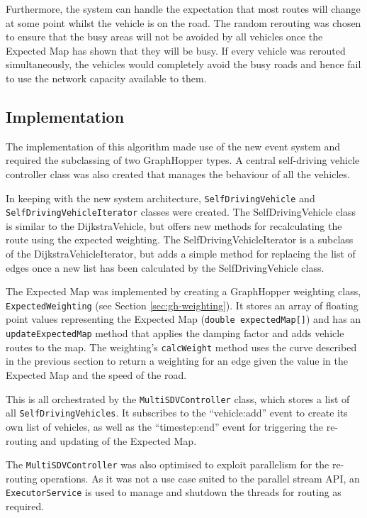 \documentclass[ %
                    author={Alexander Hill},
                supervisor={Dr. Benjamin Sach},
                    degree={MEng},
                     title={MARMOSET},
                  subtitle={Multi-Agent Route Management using Online Simulation for Efficient Transportation},
                      type={research},
                      year={2016} ]{dissertation}
\begin{document}
Furthermore, the system can handle the expectation that most routes will
change at some point whilst the vehicle is on the road. The random rerouting was
chosen to ensure that the busy areas will not be avoided by all vehicles once the
Expected Map has shown that they will be busy. If every vehicle was rerouted
simultaneously, the vehicles would completely avoid the busy roads and hence
fail to use the network capacity available to them.

\subsection{Implementation}

The implementation of this algorithm made use of the new event system and
required the subclassing of two GraphHopper types. A central self-driving vehicle
controller class was also created that manages the behaviour of all the
vehicles.

In keeping with the new system architecture, \texttt{SelfDrivingVehicle} and
\texttt{SelfDrivingVehicleIterator} classes were created. The SelfDrivingVehicle
class is similar to the DijkstraVehicle, but offers new methods for
recalculating the route using the expected weighting. The
SelfDrivingVehicleIterator is a subclass of the DijkstraVehicleIterator, but
adds a simple method for replacing the list of edges once a new list has been
calculated by the SelfDrivingVehicle class.

The Expected Map was implemented by creating a GraphHopper weighting class,
\texttt{ExpectedWeighting} (see Section \ref{sec:gh-weighting}). It stores an
array of floating point values representing the Expected Map (\texttt{double
expectedMap[]}) and has an \texttt{updateExpectedMap} method that applies the
damping factor and adds vehicle routes to the map. The weighting's
\texttt{calcWeight} method uses the curve described in the previous section to
return a weighting for an edge given the value in the Expected Map and the speed
of the road.

This is all orchestrated by the \texttt{MultiSDVController} class, which stores
a list of all \texttt{SelfDrivingVehicles}. It subscribes to the ``vehicle:add'' event
to create its own list of vehicles, as well as the ``timestep:end'' event for
triggering the re-routing and updating of the Expected Map.

The \texttt{MultiSDVController} was also optimised to exploit parallelism for the
re-routing operations. As it was not a use case suited to the parallel stream
API, an \texttt{ExecutorService} is used to manage and shutdown the threads for
routing as required.
\end{document}
